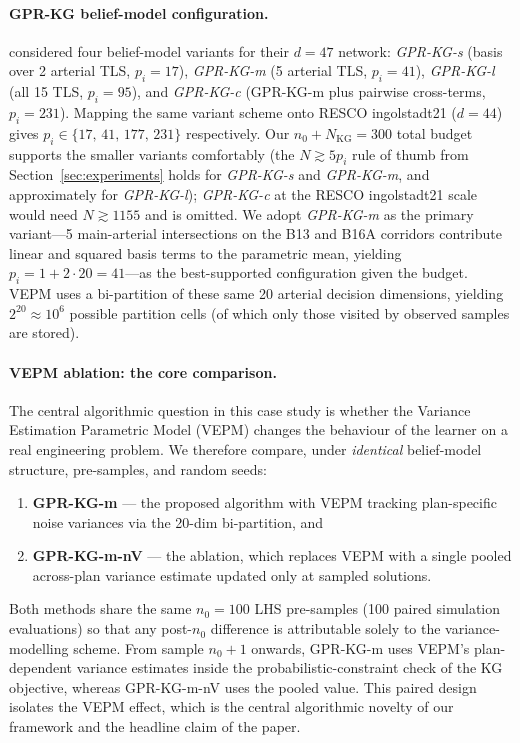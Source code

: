 \documentclass[12pt]{article}
\theoremstyle{plain}
\theoremstyle{definition}
\theoremstyle{remark}
\begin{document}
\paragraph{GPR-KG belief-model configuration.}
\citet{ZhengXueXuRan2019a} considered four belief-model variants for their
$d=47$ network: \emph{GPR-KG-s} (basis over 2 arterial TLS,
$p_{i}=17$), \emph{GPR-KG-m} (5 arterial TLS, $p_{i}=41$),
\emph{GPR-KG-l} (all 15 TLS, $p_{i}=95$), and \emph{GPR-KG-c}
(GPR-KG-m plus pairwise cross-terms, $p_{i}=231$).  Mapping the same
variant scheme onto RESCO ingolstadt21 ($d=44$) gives
$p_{i}\in\{17,\,41,\,177,\,231\}$ respectively.  Our $n_{0}+N_{\mathrm{KG}}=300$
total budget supports the smaller variants comfortably (the
$N\gtrsim 5p_{i}$ rule of thumb from Section~\ref{sec:experiments}
holds for \emph{GPR-KG-s} and \emph{GPR-KG-m}, and approximately for
\emph{GPR-KG-l}); \emph{GPR-KG-c} at the RESCO ingolstadt21 scale would need
$N\gtrsim 1155$ and is omitted.  We adopt \emph{GPR-KG-m} as the
primary variant---5 main-arterial intersections on the B13 and B16A
corridors contribute linear and squared basis terms to the parametric
mean, yielding $p_{i}=1+2\cdot 20=41$---as the best-supported
configuration given the budget.  VEPM uses a bi-partition of these
same 20 arterial decision dimensions, yielding $2^{20}\approx 10^{6}$
possible partition cells (of which only those visited by observed
samples are stored).

\paragraph{VEPM ablation: the core comparison.}
The central algorithmic question in this case study is whether the
Variance Estimation Parametric Model (VEPM) changes the behaviour of
the learner on a real engineering problem.  We therefore compare, under
\emph{identical} belief-model structure, pre-samples, and random
seeds:
\begin{enumerate}[label=(\roman*),leftmargin=2em]
  \item \textbf{GPR-KG-m} --- the proposed algorithm with VEPM
        tracking plan-specific noise variances via the 20-dim
        bi-partition, and
  \item \textbf{GPR-KG-m-nV} --- the ablation, which replaces VEPM
        with a single pooled across-plan variance estimate updated
        only at sampled solutions.
\end{enumerate}
Both methods share the same $n_{0}=100$ LHS pre-samples (100 paired
simulation evaluations) so that any post-$n_{0}$ difference is
attributable solely to the variance-modelling scheme.  From sample
$n_{0}+1$ onwards, GPR-KG-m uses VEPM's plan-dependent variance
estimates inside the probabilistic-constraint check of the KG
objective, whereas GPR-KG-m-nV uses the pooled value.  This paired
design isolates the VEPM effect, which is the central algorithmic
novelty of our framework and the headline claim of the paper.
\end{document}
